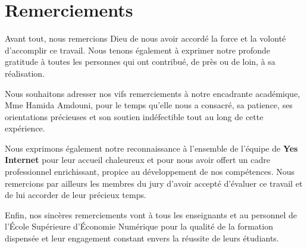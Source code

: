 \chapter*{Remerciements}
{}
\label{sec:Acknowledgements}
\thispagestyle{empty}
Avant tout, nous remercions Dieu de nous avoir accordé la force et la volonté
d'accomplir ce travail. Nous tenons également à exprimer notre profonde gratitude
à toutes les personnes qui ont contribué, de près ou de loin, à sa réalisation.

\bigskip

Nous souhaitons adresser nos vifs remerciements à notre encadrante académique,
Mme Hamida Amdouni, pour le temps qu'elle nous a consacré, sa patience, ses
orientations précieuses et son soutien indéfectible tout au long de cette expérience.

\bigskip

Nous exprimons également notre reconnaissance à l'ensemble de l'équipe de
\textbf{Yes Internet} pour leur accueil chaleureux et pour nous avoir offert un cadre
professionnel enrichissant, propice au développement de nos compétences.
Nous remercions par ailleurs les membres du jury d'avoir accepté d'évaluer
ce travail et de lui accorder de leur précieux temps.

\bigskip

Enfin, nos sincères remerciements vont à tous les enseignants et au personnel
de l'École Supérieure d'Économie Numérique pour la qualité de la formation
dispensée et leur engagement constant envers la réussite de leurs étudiants.